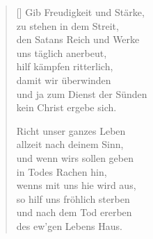 \begin{multicols}{2}
\begin{verse}[\versewidth]
 Gib Freudigkeit und Stärke,\\
zu stehen in dem Streit,\\
den Satans Reich und Werke\\
uns täglich anerbeut,\\
hilf kämpfen ritterlich,\\
damit wir überwinden\\
und ja zum Dienst der Sünden\\
kein Christ ergebe sich.

 Richt unser ganzes Leben\\
allzeit nach deinem Sinn,\\
und wenn wirs sollen geben\\
in Todes Rachen hin,\\
wenns mit uns hie wird aus,\\
so hilf uns fröhlich sterben\\
und nach dem Tod ererben\\
des ew'gen Lebens Haus.

\end{verse}
\end{multicols}
